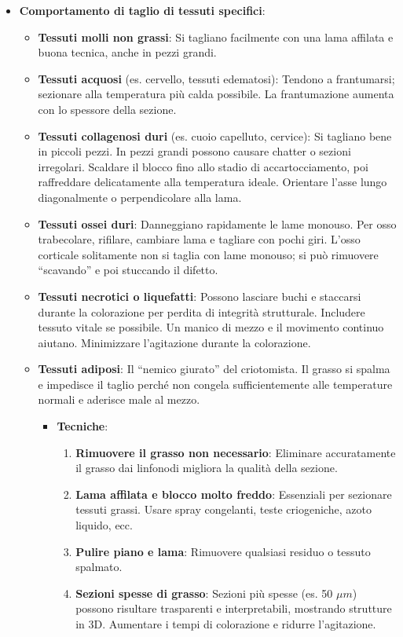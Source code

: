 \begin{itemize}
\item \textbf{Comportamento di taglio di tessuti specifici}:
\begin{itemize}
\item \textbf{Tessuti molli non grassi}: Si tagliano facilmente con una lama affilata e buona tecnica, anche in pezzi grandi.
\item \textbf{Tessuti acquosi} (es. cervello, tessuti edematosi): Tendono a frantumarsi; sezionare alla temperatura più calda possibile. La frantumazione aumenta con lo spessore della sezione.
\item \textbf{Tessuti collagenosi duri} (es. cuoio capelluto, cervice): Si tagliano bene in piccoli pezzi. In pezzi grandi possono causare chatter o sezioni irregolari. Scaldare il blocco fino allo stadio di accartocciamento, poi raffreddare delicatamente alla temperatura ideale. Orientare l'asse lungo diagonalmente o perpendicolare alla lama.
\item \textbf{Tessuti ossei duri}: Danneggiano rapidamente le lame monouso. Per osso trabecolare, rifilare, cambiare lama e tagliare con pochi giri. L'osso corticale solitamente non si taglia con lame monouso; si può rimuovere “scavando” e poi stuccando il difetto.
\item \textbf{Tessuti necrotici o liquefatti}: Possono lasciare buchi e staccarsi durante la colorazione per perdita di integrità strutturale. Includere tessuto vitale se possibile. Un manico di mezzo e il movimento continuo aiutano. Minimizzare l'agitazione durante la colorazione.
\item \textbf{Tessuti adiposi}: Il “nemico giurato” del criotomista. Il grasso si spalma e impedisce il taglio perché non congela sufficientemente alle temperature normali e aderisce male al mezzo.
\begin{itemize}
\item \textbf{Tecniche}:
\begin{enumerate}
\item \textbf{Rimuovere il grasso non necessario}: Eliminare accuratamente il grasso dai linfonodi migliora la qualità della sezione.
\item \textbf{Lama affilata e blocco molto freddo}: Essenziali per sezionare tessuti grassi. Usare spray congelanti, teste criogeniche, azoto liquido, ecc.
\item \textbf{Pulire piano e lama}: Rimuovere qualsiasi residuo o tessuto spalmato.
\item \textbf{Sezioni spesse di grasso}: Sezioni più spesse (es. 50 $\mu m$) possono risultare trasparenti e interpretabili, mostrando strutture in 3D. Aumentare i tempi di colorazione e ridurre l'agitazione.

\end{enumerate}
\end{itemize}
\end{itemize}
\end{itemize}
